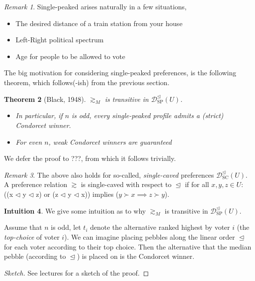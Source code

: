 \documentclass{book}
\newcommand{\unclear}[1]{%
  \par\noindent
  \colorbox{yellow!30}{#1}\par
}
\theoremstyle{plain}
\newtheorem{theorem}{Theorem}[subsection]
\theoremstyle{definition}
\newtheorem{intuition}[theorem]{Intuition}
\theoremstyle{remark}
\newtheorem{remark}[theorem]{Remark}
\begin{document}
\begin{remark}
    Single-peaked arises naturally in a few situations,
    \begin{itemize}
        \item The desired distance of a train station from 
        your house
        \item Left-Right political spectrum
        \item Age for people to be allowed to vote
    \end{itemize}
\end{remark}

The big motivation for 
considering single-peaked preferences, is the following 
theorem, which follows(-ish) from the previous section.
\begin{theorem}[Black, 1948]
    $\gtrsim_M$ is transitive in 
    $\mathcal{D}_{\text{SP}}^{\trianglelefteq}(U)$.

    \begin{itemize}
        \item In particular, if $n$ is odd, every single-peaked profile 
        admits a (strict) Condorcet winner.
        \item For even $n$, weak Condorcet winners are guaranteed
    \end{itemize}
\end{theorem}

We defer the proof to ???, from which it follows trivially.


\begin{remark}
    The above also holds for so-called, 
    \emph{single-caved} preferences $\mathcal{D}_{\text{SC}}^{\trianglelefteq}(U)$.
    A preference relation $\gtrsim$ is single-caved with respect to $\trianglelefteq$ if for all $x, y, z \in U$:
    ((x $\triangleleft$ y $\triangleleft$ z) or (z $\triangleleft$ y $\triangleleft$ x)) implies
    ($y \succ x \implies z \succ y$).   
\end{remark}

\begin{intuition}
    We give some intuition as to why
    $\gtrsim_M$ is transitive in $\mathcal{D}_{\text{SP}}^{\trianglelefteq}(U)$.

    Assume that $n$ is odd, 
    let $t_i$ denote the alternative ranked highest
    by voter $i$ (the \emph{top-choice} of voter $i$).
    We can imagine placing pebbles 
    along the linear order $\trianglelefteq$ for each voter 
    according to their top choice.
    Then the alternative that the
    median pebble (according to $\trianglelefteq$) is placed on is the Condorcet winner.
\end{intuition}
\begin{proof}[Sketch]
    \unclear{See lectures for a sketch of the proof.}
\end{proof}
\end{document}
